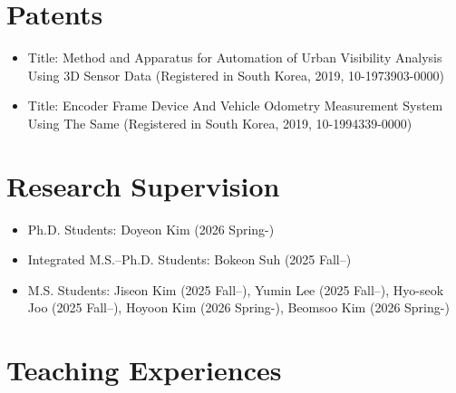 \documentclass{cv} %
\begin{document}
\section{Patents}
\begin{itemize}[label=$\cdot$]
\item Title: Method and Apparatus for Automation of Urban Visibility Analysis Using 3D Sensor Data (Registered in South Korea, 2019, 10-1973903-0000)
\vspace{-1mm}
\item Title: Encoder Frame Device And Vehicle Odometry Measurement System Using The Same (Registered in South Korea, 2019, 10-1994339-0000)
\end{itemize} 

\section{Research Supervision}
\begin{itemize}[label=$\cdot$]
  \item Ph.D. Students: Doyeon Kim (2026 Spring-)
  \item Integrated M.S.–Ph.D. Students: Bokeon Suh (2025 Fall–)
  \item M.S. Students: Jiseon Kim (2025 Fall–), Yumin Lee (2025 Fall–), Hyo-seok Joo (2025 Fall–), Hoyoon Kim (2026 Spring-), Beomsoo Kim (2026 Spring-)
\end{itemize}

\section{Teaching Experiences}
\end{document}

